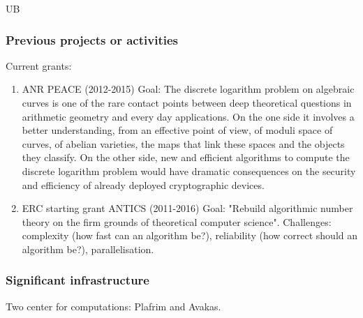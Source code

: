\begin{sitedescription}{UB}
\subsubsection*{Previous projects or activities}

Current grants:
\begin{enumerate}
\item
 ANR PEACE (2012-2015)
    Goal: The discrete logarithm problem on algebraic curves is one of the rare
    contact points between deep theoretical questions in arithmetic geometry and
    every day applications. On the one side it involves a better understanding,
    from an effective point of view, of moduli space of curves, of abelian
    varieties, the maps that link these spaces and the objects they classify.
    On the other side, new and efficient algorithms to compute the discrete
    logarithm problem would have dramatic consequences on the security and
    efficiency of already deployed cryptographic devices. 

\item
ERC starting grant ANTICS (2011-2016) 
    Goal: "Rebuild algorithmic number theory on the firm grounds of theoretical
    computer science".
    Challenges: complexity (how fast can an algorithm be?), reliability
    (how correct should an algorithm be?), parallelisation.
\end{enumerate}

\subsubsection*{Significant infrastructure}

Two center for computations: Plafrim and Avakas.
\end{sitedescription}


